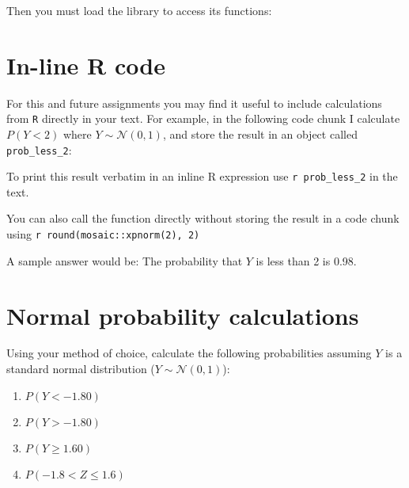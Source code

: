 \documentclass[letterpaper,9pt,twoside,printwatermark=false]{pinp}
\providecommand{\tightlist}{%
  \setlength{\itemsep}{0pt}\setlength{\parskip}{0pt}}
\begin{document}
Then you must load the library to access its functions:

\begin{Shaded}
\begin{Highlighting}[]
\end{Highlighting}
\end{Shaded}

\section*{In-line R code}\label{in-line-r-code}

For this and future assignments you may find it useful to include
calculations from \texttt{R} directly in your text. For example, in the
following code chunk I calculate \(P(Y < 2)\) where
\(Y \sim \mathcal{N}(0,1)\), and store the result in an object called
\texttt{prob\_less\_2}:

\begin{Shaded}
\begin{Highlighting}[]

\end{Highlighting}
\end{Shaded}

To print this result verbatim in an inline R expression use
\texttt{\textasciigrave{}r\ prob\_less\_2\textasciigrave{}} in the text.

\vspace{0.1in}

You can also call the function directly without storing the result in a
code chunk using
\texttt{\textasciigrave{}r\ round(mosaic::xpnorm(2),\ 2)\textasciigrave{}}

A sample answer would be: The probability that \(Y\) is less than 2 is
0.98.

\section{Normal probability
calculations}\label{normal-probability-calculations}

Using your method of choice, calculate the following probabilities
assuming \(Y\) is a standard normal distribution
(\(Y \sim \mathcal{N}(0,1)\)):

\begin{enumerate}
\def\labelenumi{\alph{enumi})}
\tightlist
\item
  \(P(Y < -1.80)\)
\item
  \(P(Y > -1.80)\)
\item
  \(P(Y \geq 1.60)\)
\item
  \(P(-1.8 < Z \leq 1.6)\)
\end{enumerate}
\end{document}
